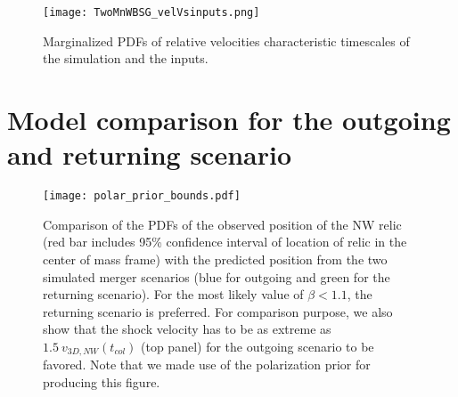 \begin{figure*}
\begin{minipage}{180mm}
	\begin{center}
	\texttt{[image: TwoMnWBSG\_velVsinputs.png]}
	\caption{Marginalized PDFs of relative velocities characteristic
	timescales of the simulation and the inputs.}
	\end{center}
\end{minipage}
\end{figure*}

\section{Model comparison for the outgoing and returning scenario}
\label{app:Bayes_factor}
\begin{figure}
	\texttt{[image: polar\_prior\_bounds.pdf]}
	\caption{Comparison of the PDFs of the observed position of the NW relic (red bar
		includes 95\% confidence interval of location of relic in the center of
		mass frame) with the	predicted position from the two simulated merger scenarios (blue for
	outgoing and green for the returning scenario). 
	For the most likely value of $\beta < 1.1$, the returning scenario is preferred. 
	For comparison purpose, we also show that the shock velocity has to
	be as extreme as $1.5~v_{3D, NW}(t_{col})$ (top panel) for the outgoing
	scenario to be favored. 
	Note that we made use of the	polarization prior for producing this figure. 
	\label{fig: positionprior}}
\end{figure}

